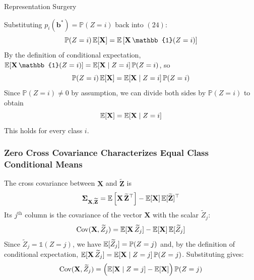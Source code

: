 \begin{question}{Representation Surgery}
\begin{subquestion}
Substituting $p_i(\mathbf{b}^\ast) = \mathbb{P}(Z = i)$ back into $(24)$:
\begin{equation}
    \mathbb{P}(Z = i)\, \expectation[\mathbf{X}] = \expectation\left[\mathbf{X}\, \mathbb{1}(Z = i)\right]
\end{equation}
By the definition of conditional expectation, $\expectation[\mathbf{X}\, \mathbb{1}(Z = i)] = \expectation[\mathbf{X} \mid Z = i]\, \mathbb{P}(Z = i)$, so
\begin{equation}
    \mathbb{P}(Z = i)\, \expectation[\mathbf{X}] = \expectation[\mathbf{X} \mid Z = i]\, \mathbb{P}(Z = i)
\end{equation}
Since $\mathbb{P}(Z = i) \neq 0$ by assumption, we can divide both sides by $\mathbb{P}(Z = i)$ to obtain
\begin{equation}
    \expectation[\mathbf{X}] = \expectation[\mathbf{X} \mid Z = i]
\end{equation}
This holds for every class $i$.

\end{subquestion}

\begin{subquestion}

\subsubsection*{Zero Cross Covariance Characterizes Equal Class Conditional Means}

The cross covariance between $\mathbf{X}$ and $\widetilde{\mathbf{Z}}$ is
\begin{equation}
    \boldsymbol{\Sigma}_{\mathbf{X}, \widetilde{\mathbf{Z}}} = \expectation\left[\mathbf{X}\, \widetilde{\mathbf{Z}}^\top\right] - \expectation[\mathbf{X}]\, \expectation[\widetilde{\mathbf{Z}}]^\top
\end{equation}
Its $j^\text{th}$ column is the covariance of the vector $\mathbf{X}$ with the scalar $\widetilde{Z}_j$:
\begin{equation}
    \mathrm{Cov}(\mathbf{X}, \widetilde{Z}_j) = \expectation[\mathbf{X}\, \widetilde{Z}_j] - \expectation[\mathbf{X}]\, \expectation[\widetilde{Z}_j]
\end{equation}
Since $\widetilde{Z}_j = \mathbb{1}(Z = j)$, we have $\expectation[\widetilde{Z}_j] = \mathbb{P}(Z = j)$ and, by the definition of conditional expectation, $\expectation[\mathbf{X}\, \widetilde{Z}_j] = \expectation[\mathbf{X} \mid Z = j]\, \mathbb{P}(Z = j)$. 
Substituting gives:
\begin{equation}
    \mathrm{Cov}(\mathbf{X}, \widetilde{Z}_j) = \Big(\expectation[\mathbf{X} \mid Z = j] - \expectation[\mathbf{X}]\Big)\, \mathbb{P}(Z = j)
\end{equation}


\end{subquestion}
\end{question}
